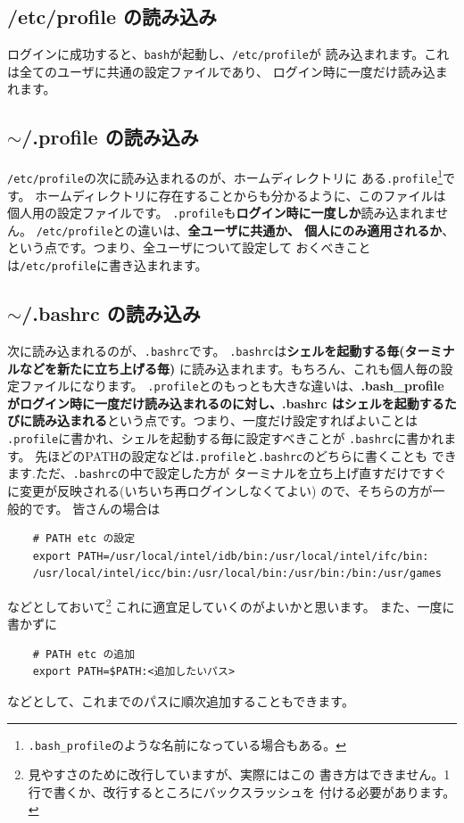 \documentclass[a4j]{ltjsreport}
\begin{document}
    \subsection{/etc/profile の読み込み}
    ログインに成功すると、\verb+bash+が起動し、\verb+/etc/profile+が
    読み込まれます。これは全てのユーザに共通の設定ファイルであり、
    ログイン時に一度だけ読み込まれます。

    \subsection{$\sim$/.profile の読み込み}
    \verb+/etc/profile+の次に読み込まれるのが、ホームディレクトリに
    ある\verb+.profile+\footnote{\texttt{.bash\_profile}のような名前になっている場合もある。}です。
    ホームディレクトリに存在することからも分かるように、このファイルは個人用の設定ファイルです。
    \verb+.profile+も\textbf{ログイン時に一度しか}読み込まれません。
    \verb+/etc/profile+との違いは、\textbf{全ユーザに共通か、
    個人にのみ適用されるか}、という点です。つまり、全ユーザについて設定して
    おくべきことは\verb+/etc/profile+に書き込まれます。

    \subsection{$\sim$/.bashrc の読み込み}
    次に読み込まれるのが、\verb+.bashrc+です。
    \verb+.bashrc+は\textbf{シェルを起動する毎(ターミナルなどを新たに立ち上げる毎)}
    に読み込まれます。もちろん、これも個人毎の設定ファイルになります。
    \verb+.profile+とのもっとも大きな違いは、\textbf{.bash\_profile 
    がログイン時に一度だけ読み込まれるのに対し、.bashrc はシェルを起動するた
    びに読み込まれる}という点です。つまり、一度だけ設定すればよいことは
    \verb+.profile+に書かれ、シェルを起動する毎に設定すべきことが
    \verb+.bashrc+に書かれます。
    先ほどのPATHの設定などは\verb+.profile+と\verb+.bashrc+のどちらに書くことも
    できます.ただ、\verb+.bashrc+の中で設定した方が
    ターミナルを立ち上げ直すだけですぐに変更が反映される(いちいち再ログインしなくてよい)
    ので、そちらの方が一般的です。
    皆さんの場合は
    \begin{verbatim}
    # PATH etc の設定
    export PATH=/usr/local/intel/idb/bin:/usr/local/intel/ifc/bin:
    /usr/local/intel/icc/bin:/usr/local/bin:/usr/bin:/bin:/usr/games
    \end{verbatim}
    などとしておいて\footnote{見やすさのために改行していますが、実際にはこの
    書き方はできません。1行で書くか、改行するところにバックスラッシュを
    付ける必要があります。}
    これに適宜足していくのがよいかと思います。
    また、一度に書かずに
    \begin{verbatim}
    # PATH etc の追加
    export PATH=$PATH:<追加したいパス>
    \end{verbatim}
    などとして、これまでのパスに順次追加することもできます。
    \vspace*{3mm}
\end{document}
